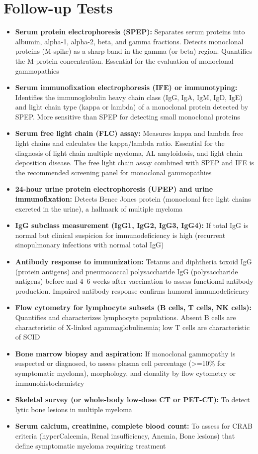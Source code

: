 \section*{Follow-up Tests}
\begin{itemize}
  \item \textbf{Serum protein electrophoresis (SPEP):} Separates serum proteins into albumin, alpha-1, alpha-2, beta, and gamma fractions. Detects monoclonal proteins (M-spike) as a sharp band in the gamma (or beta) region. Quantifies the M-protein concentration. Essential for the evaluation of monoclonal gammopathies
  \item \textbf{Serum immunofixation electrophoresis (IFE) or immunotyping:} Identifies the immunoglobulin heavy chain class (IgG, IgA, IgM, IgD, IgE) and light chain type (kappa or lambda) of a monoclonal protein detected by SPEP. More sensitive than SPEP for detecting small monoclonal proteins
  \item \textbf{Serum free light chain (FLC) assay:} Measures kappa and lambda free light chains and calculates the kappa/lambda ratio. Essential for the diagnosis of light chain multiple myeloma, AL amyloidosis, and light chain deposition disease. The free light chain assay combined with SPEP and IFE is the recommended screening panel for monoclonal gammopathies
  \item \textbf{24-hour urine protein electrophoresis (UPEP) and urine immunofixation:} Detects Bence Jones protein (monoclonal free light chains excreted in the urine), a hallmark of multiple myeloma
  \item \textbf{IgG subclass measurement (IgG1, IgG2, IgG3, IgG4):} If total IgG is normal but clinical suspicion for immunodeficiency is high (recurrent sinopulmonary infections with normal total IgG)
  \item \textbf{Antibody response to immunization:} Tetanus and diphtheria toxoid IgG (protein antigens) and pneumococcal polysaccharide IgG (polysaccharide antigens) before and 4--6 weeks after vaccination to assess functional antibody production. Impaired antibody response confirms humoral immunodeficiency
  \item \textbf{Flow cytometry for lymphocyte subsets (B cells, T cells, NK cells):} Quantifies and characterizes lymphocyte populations. Absent B cells are characteristic of X-linked agammaglobulinemia; low T cells are characteristic of SCID
  \item \textbf{Bone marrow biopsy and aspiration:} If monoclonal gammopathy is suspected or diagnosed, to assess plasma cell percentage (>=10\% for symptomatic myeloma), morphology, and clonality by flow cytometry or immunohistochemistry \cite{rajkumar2014international}
  \item \textbf{Skeletal survey (or whole-body low-dose CT or PET-CT):} To detect lytic bone lesions in multiple myeloma
  \item \textbf{Serum calcium, creatinine, complete blood count:} To assess for CRAB criteria (hyperCalcemia, Renal insufficiency, Anemia, Bone lesions) that define symptomatic myeloma requiring treatment
\end{itemize}

